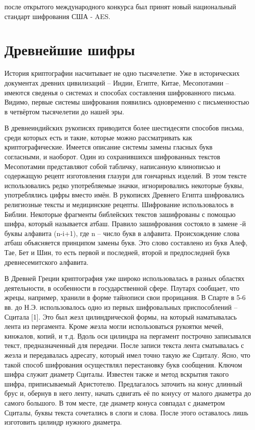 после открытого международного конкурса был принят новый национальный стандарт шифрования США - AES.




\section{Древнейшие шифры}
История криптографии насчитывает не одно тысячелетие. Уже в исторических документах древних цивилизаций – Индии, Египте, Китае, Месопотамии – имеются сведенья о системах и способах составления шифрованного письма. Видимо, первые системы шифрования появились одновременно с письменностью в четвёртом тысячелетии до нашей эры.

В древнеиндийских рукописях приводится более шестидесяти способов письма, среди которых есть и такие, которые можно рассматривать как криптографические. Имеется описание системы замены гласных букв согласными, и наоборот. Один из сохранившихся шифрованных текстов Месопотамии представляют собой табличку, написанную клинописью и содержащую рецепт изготовления глазури для гончарных изделий. В этом тексте использовались редко употребляемые значки, игнорировались некоторые буквы, употреблялись цифры вместо имён. В рукописях Древнего Египта шифровались религиозные тексты и медицинские рецепты. Шифрование использовалось в Библии. Некоторые фрагменты библейских текстов зашифрованы с помощью шифра, который называется атбаш. Правило зашифрования состояло в замене -й буквы алфавита (n-i+1), где n – число букв в алфавита. Происхождение слова атбаш объясняется принципом замены букв. Это слово составлено из букв Алеф, Тае, Бет и Шин, то есть первой и последней, второй и предпоследней букв древнесемитского алфавита.

В Древней Греции криптография уже широко использовалась в разных областях деятельности, в особенности в государственной сфере. Плутарх сообщает, что жрецы, например, хранили в форме тайнописи свои прорицания. В Спарте в 5-6 вв. до Н.Э. использовалось одно из первых шифровальных приспособлений – Сцитала [1]. Это был жезл цилиндрической формы, на который наматывалась лента из пергамента. Кроме жезла могли использоваться рукоятки мечей, кинжалов, копий, и т.д. Вдоль оси цилиндра на пергамент построчно записывался текст, предназначенный для передачи. После записи текста лента сматывалась с жезла и передавалась адресату, который имел точно такую же Сциталу. Ясно, что такой способ шифрования осуществлял перестановку букв сообщения. Ключом шифра служит диаметр Сциталы. Известен также и метод вскрытия такого шифра, приписываемый Аристотелю. Предлагалось заточить на конус длинный брус и, обернув в него ленту, начать сдвигать её по конусу от малого диаметра до самого большого. В том месте, где диаметр конуса совпадал с диаметром Сциталы, буквы текста сочетались в слоги и слова. После этого оставалось лишь изготовить цилиндр нужного диаметра.

